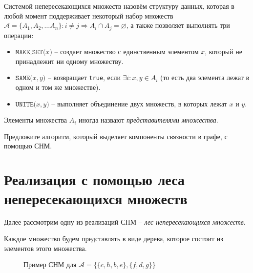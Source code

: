 \Def Системой непересекающихся множеств назовём структуру данных, которая в любой момент поддерживает некоторый набор множеств $\mathcal{A} = \{A_1, A_2, \dots A_n\}: i \neq j \Rightarrow A_i \cap A_j = \varnothing$, а также позволяет выполнять три операции:
\begin{itemize}
    \item $\texttt{MAKE\_SET(}x\texttt{)}$ -- создает множество с единственным элементом $x$, который не принадлежит ни одному множеству.
    \item $\texttt{SAME(}x, y\texttt{)}$ -- возвращает \texttt{true}, если $\exists i: x, y \in A_i$ (то есть два элемента лежат в одном и том же множестве).
    \item $\texttt{UNITE(}x, y\texttt{)}$ -- выполняет объединение двух множеств, в которых лежат $x$ и $y$.
\end{itemize}
Элементы множества $A_i$ иногда назвают \textit{представителями множества}.

\Exe Предложите алгоритм, который выделяет компоненты связности в графе, с помощью СНМ.

\section{Реализация с помощью леса непересекающихся множеств}

Далее рассмотрим одну из реализаций СНМ -- \textit{лес непересекающихся множеств}.

Каждое множество будем представлять в виде дерева, которое состоит из элементов этого множества.

\begin{figure}[H]
    \centering
    \caption{Пример СНМ для $\mathcal{A} = \{ \{c, h, b, e\}, \{f, d, g\}\}$}
\end{figure}

